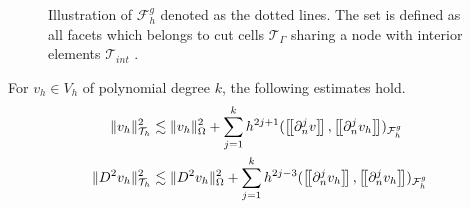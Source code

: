 \begin{figure}

\caption{Illustration of $\mathcal{F} _{h}^{g}$ denoted as the dotted lines. The set is defined as all facets which belongs to cut cells $\mathcal{T} _{\Gamma }$ sharing a node with interior elements $\mathcal{T} _{int }$ .  }
\label{fig:illustration_F_g}
\end{figure}





\begin{lemma}
    \label{lemma:bi_inv_gh_lemma}
    For $v_{h} \in  V_{h}$ of polynomial degree $k$, the following estimates hold.
        \begin{align}
            \label{eq:bi_inv_gh_1}
        \| v_h \|_{ \mathcal{T} _{h} }^{ 2 }  & \lesssim  \| v_h \|_{ \Omega  }^{ 2 }  + \sum_{j=1}^{k} h^{2j+1} ( \jump{ \partial ^{j}_{n} v }, \jump{ \partial ^{j}_{n} v_h}    )_{\mathcal{F}_{h}^{g}}\\
            \label{eq:bi_inv_gh_2}
        \| D ^2 v_h \|_{ \mathcal{T} _{h} }^{ 2 }  & \lesssim  \| D^2 v_h \|_{ \Omega  }^{ 2 }  + \sum_{j=1}^{k} h^{2j-3} ( \jump{ \partial ^{j}_{n} v_h }, \jump{ \partial ^{j}_{n}v_h }    )_{\mathcal{F}_{h}^{g}}
        \end{align}
\end{lemma}

